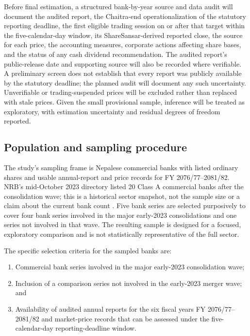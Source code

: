Before final estimation, a structured bank-by-year source and data audit will
document the audited report, the Chaitra-end operationalization of the statutory
reporting deadline, the first eligible trading session on or after that target
within the five-calendar-day window, its ShareSansar-derived reported close,
the source for each price, the accounting measures, corporate actions affecting
share bases, and the status of any cash dividend recommendation. The audited
report's public-release date and supporting source will also be recorded where
verifiable. A preliminary screen
does not establish that every report was publicly available by the statutory
deadline; the planned audit will document any such uncertainty. Unverifiable or
trading-suspended prices will be excluded rather than replaced with stale prices.
Given the small provisional sample, inference will be treated as exploratory,
with estimation uncertainty and residual degrees of freedom reported.

\subsection{Population and sampling procedure}
The study's sampling frame is Nepalese commercial banks with listed ordinary
shares and usable annual-report and price records for FY 2076/77--2081/82. NRB's
mid-October 2023 directory listed 20 Class A commercial banks after the
consolidation wave; this is a historical sector snapshot, not the sample size
or a claim about the current bank count \citep{nrb2023list}. Five bank series
are selected purposively to cover four bank series involved in the major
early-2023 consolidations and one series not involved in that wave. The
resulting sample is designed for a
focused, exploratory comparison and is not statistically representative of
the full sector.

The specific selection criteria for the sampled banks are:
\begin{enumerate}[label=(\roman*)]
  \item Commercial bank series involved in the major early-2023 consolidation wave;
  \item Inclusion of a comparison series not involved in the early-2023 merger wave; and
  \item Availability of audited annual reports for the six fiscal years FY 2076/77--2081/82 and market-price records that can be assessed under the five-calendar-day reporting-deadline window.
\end{enumerate}

